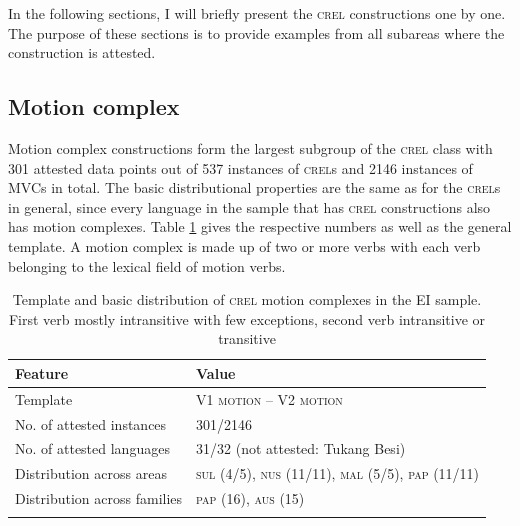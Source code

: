 In the following sections, I will briefly present the \textsc{crel} constructions one by one. The purpose of these sections is to provide examples from all subareas where the construction is attested.

\subsection{Motion complex} \label{sec:motioncomplex}

Motion complex constructions form the largest subgroup of the \textsc{crel} class with 301 attested data points out of 537 instances of \textsc{crel}s and 2146 instances of MVCs in total. The basic distributional properties are the same as for the \textsc{crel}s in general, since every language in the sample that has \textsc{crel} constructions also has motion complexes. Table \ref{table:basiccrelmotion} gives the respective numbers as well as the general template. A motion complex is made up of two or more verbs with each verb belonging to the lexical field of motion verbs.

\begin{table}
\begin{tabular}{ll}
\lsptoprule
Feature&Value\tabularnewline
\midrule
Template&V1 \textsc{motion} -- V2 \textsc{motion}\tabularnewline
No. of attested instances& 301/2146 \tabularnewline
No. of attested languages& 31/32 (not attested: Tukang Besi) \tabularnewline
Distribution across areas& \textsc{sul} (4/5), \textsc{nus} (11/11), \textsc{mal} (5/5), \textsc{pap} (11/11) \tabularnewline
Distribution across families& \textsc{pap} (16), \textsc{aus} (15) \tabularnewline
\lspbottomrule
\end{tabular}
\caption[Template and basic distribution of \textsc{crel} motion complexes]{Template and basic distribution of \textsc{crel} motion complexes in the EI sample. First verb mostly intransitive with few exceptions, second verb intransitive or transitive}
\label{table:basiccrelmotion}
\end{table}

